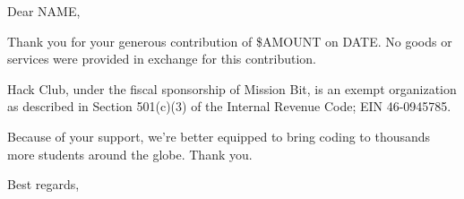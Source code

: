 \documentclass[11pt]{letter}
\begin{document}
\begin{letter}{}
  \opening{Dear NAME,}

  Thank you for your generous contribution of \$AMOUNT on DATE. No goods or
  services were provided in exchange for this contribution.

  Hack Club, under the fiscal sponsorship of Mission Bit, is an exempt
  organization as described in Section 501(c)(3) of the Internal Revenue Code;
  EIN 46-0945785.

  Because of your support, we're better equipped to bring coding to thousands
  more students around the globe. Thank you.

  \closing{
    Best regards, \\
     \\
  }
\end{letter}
\end{document}
